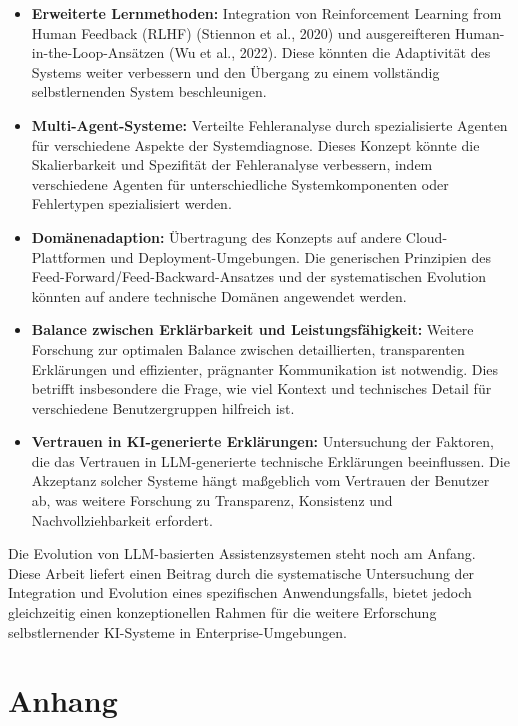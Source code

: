 \documentclass[
  a4paper,
  12pt,
  oneside,
  open=any,
  BCOR=12mm,
  DIV=14,
  parskip=half*,
  headsepline,
  footsepline,
  pointlessnumbers,
  liststotoc,
  numbers=noenddot,
  listof=totoc]{scrartcl}
\providecommand{\tightlist}{%
  \setlength{\itemsep}{0pt}\setlength{\parskip}{0pt}}\usepackage{longtable,booktabs,array}
\begin{document}
\begin{itemize}
\tightlist
\item
  \textbf{Erweiterte Lernmethoden:} Integration von Reinforcement
  Learning from Human Feedback (RLHF) (Stiennon et al., 2020) und
  ausgereifteren Human-in-the-Loop-Ansätzen (Wu et al., 2022). Diese
  könnten die Adaptivität des Systems weiter verbessern und den Übergang
  zu einem vollständig selbstlernenden System beschleunigen.
\item
  \textbf{Multi-Agent-Systeme:} Verteilte Fehleranalyse durch
  spezialisierte Agenten für verschiedene Aspekte der Systemdiagnose.
  Dieses Konzept könnte die Skalierbarkeit und Spezifität der
  Fehleranalyse verbessern, indem verschiedene Agenten für
  unterschiedliche Systemkomponenten oder Fehlertypen spezialisiert
  werden.
\item
  \textbf{Domänenadaption:} Übertragung des Konzepts auf andere
  Cloud-Plattformen und Deployment-Umgebungen. Die generischen
  Prinzipien des Feed-Forward/Feed-Backward-Ansatzes und der
  systematischen Evolution könnten auf andere technische Domänen
  angewendet werden.
\item
  \textbf{Balance zwischen Erklärbarkeit und Leistungsfähigkeit:}
  Weitere Forschung zur optimalen Balance zwischen detaillierten,
  transparenten Erklärungen und effizienter, prägnanter Kommunikation
  ist notwendig. Dies betrifft insbesondere die Frage, wie viel Kontext
  und technisches Detail für verschiedene Benutzergruppen hilfreich ist.
\item
  \textbf{Vertrauen in KI-generierte Erklärungen:} Untersuchung der
  Faktoren, die das Vertrauen in LLM-generierte technische Erklärungen
  beeinflussen. Die Akzeptanz solcher Systeme hängt maßgeblich vom
  Vertrauen der Benutzer ab, was weitere Forschung zu Transparenz,
  Konsistenz und Nachvollziehbarkeit erfordert.
\end{itemize}

Die Evolution von LLM-basierten Assistenzsystemen steht noch am Anfang.
Diese Arbeit liefert einen Beitrag durch die systematische Untersuchung
der Integration und Evolution eines spezifischen Anwendungsfalls, bietet
jedoch gleichzeitig einen konzeptionellen Rahmen für die weitere
Erforschung selbstlernender KI-Systeme in Enterprise-Umgebungen.

\appendix
\renewcommand{\thefigure}{A\arabic{figure}}
\renewcommand{\thetable}{A\arabic{table}}
\setcounter{figure}{0}
\setcounter{table}{0}

\section{Anhang}\label{anhang}
\end{document}
